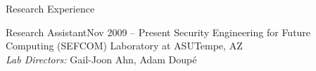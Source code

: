 \begin{rSection}{Research Experience}

  \begin{rExperienceHeader}{Research Assistant}{Nov 2009 -- Present}%
      {Security Engineering for Future Computing (SEFCOM) Laboratory at ASU}{Tempe, AZ\\
      \emph{Lab Directors:} Gail-Joon Ahn, Adam Doup\'{e}}


  \end{rExperienceHeader}


\end{rSection}
